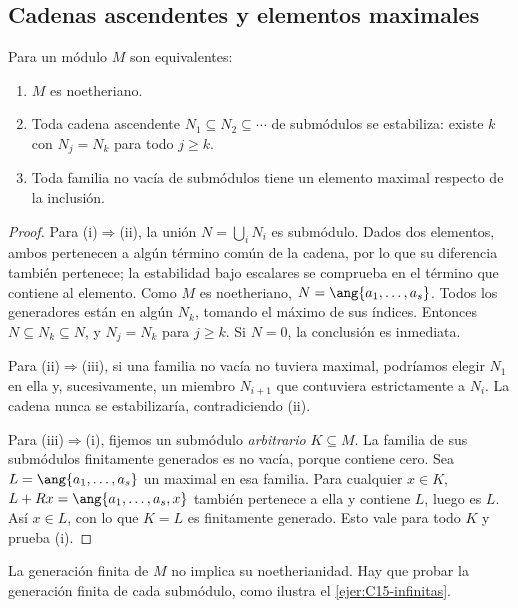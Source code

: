 \subsection{Cadenas ascendentes y elementos maximales}
\begin{prop}\label{prop:C15-cadenas}
Para un módulo $M$ son equivalentes:
\begin{enumerate}[label=\textup{(\roman*)}]
\item $M$ es noetheriano.
\item Toda cadena ascendente $N_1\subseteq N_2\subseteq\cdots$ de submódulos se estabiliza: existe $k$ con $N_j=N_k$ para todo $j\geq k$.
\item Toda familia no vacía de submódulos tiene un elemento maximal respecto de la inclusión.
\end{enumerate}
\end{prop}
\begin{proof}
Para (i)$\Rightarrow$(ii), la unión $N=\bigcup_i N_i$ es submódulo. Dados dos elementos, ambos pertenecen a algún término común de la cadena, por lo que su diferencia también pertenece; la estabilidad bajo escalares se comprueba en el término que contiene al elemento. Como $M$ es noetheriano, $N=\ang{a_1,\ldots,a_s}$. Todos los generadores están en algún $N_k$, tomando el máximo de sus índices. Entonces $N\subseteq N_k\subseteq N$, y $N_j=N_k$ para $j\geq k$. Si $N=0$, la conclusión es inmediata.

Para (ii)$\Rightarrow$(iii), si una familia no vacía no tuviera maximal, podríamos elegir $N_1$ en ella y, sucesivamente, un miembro $N_{i+1}$ que contuviera estrictamente a $N_i$. La cadena nunca se estabilizaría, contradiciendo (ii).

Para (iii)$\Rightarrow$(i), fijemos un submódulo \emph{arbitrario} $K\subseteq M$. La familia de sus submódulos finitamente generados es no vacía, porque contiene cero. Sea $L=\ang{a_1,\ldots,a_s}$ un maximal en esa familia. Para cualquier $x\in K$, $L+Rx=\ang{a_1,\ldots,a_s,x}$ también pertenece a ella y contiene $L$, luego es $L$. Así $x\in L$, con lo que $K=L$ es finitamente generado. Esto vale para todo $K$ y prueba (i).
\end{proof}
\begin{obs}
La generación finita de $M$ no implica su noetherianidad. Hay que probar la generación finita de cada submódulo, como ilustra el \cref{ejer:C15-infinitas}.
\end{obs}

